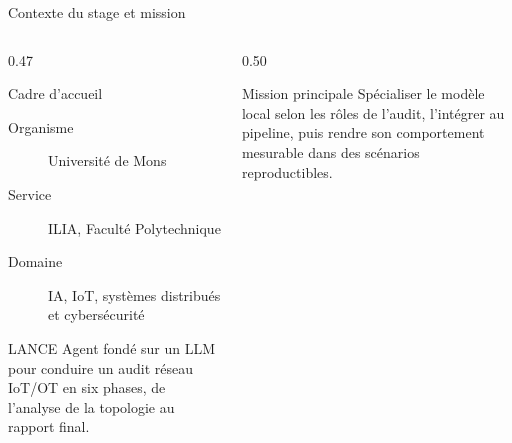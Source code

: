 \documentclass[aspectratio=169,10pt]{beamer}
\begin{document}
\begin{frame}{Contexte du stage et mission}
  \begin{columns}[T,onlytextwidth]
    \begin{column}{0.47\textwidth}
      \begin{block}{Cadre d'accueil}
        \begin{description}
          \item[Organisme] Université de Mons
          \item[Service] ILIA, Faculté Polytechnique
          \item[Domaine] IA, IoT, systèmes distribués et cybersécurité
        \end{description}
      \end{block}
      \vspace{0.4em}
      \begin{exampleblock}{LANCE}
        Agent fondé sur un LLM pour conduire un audit réseau IoT/OT en six
        phases, de l'analyse de la topologie au rapport final.
      \end{exampleblock}
    \end{column}
    \begin{column}{0.50\textwidth}
      \centering
      \vspace{1.2em}
      \begin{alertblock}{Mission principale}
        Spécialiser le modèle local selon les rôles de l'audit, l'intégrer au
        pipeline, puis rendre son comportement mesurable dans des scénarios
        reproductibles.
      \end{alertblock}
    \end{column}
  \end{columns}
\end{frame}
\end{document}
